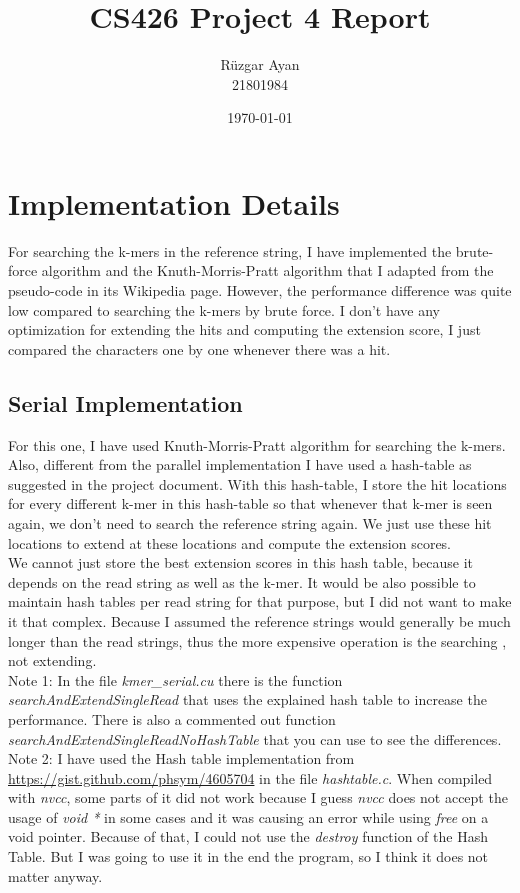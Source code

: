 \documentclass{article}
\title{CS426 Project 4 Report}
\author{Rüzgar Ayan \\ 21801984}
\date{\today}
\begin{document}
\maketitle

\section{Implementation Details}
For searching the k-mers in the reference string, I have implemented the brute-force algorithm and the Knuth-Morris-Pratt algorithm that I adapted from the pseudo-code in its Wikipedia page. However, the performance difference was quite low compared to searching the k-mers by brute force. I don't have any optimization for extending the hits and computing the extension score, I just compared the characters one by one whenever there was a hit.

\subsection{Serial Implementation}
For this one, I have used Knuth-Morris-Pratt algorithm for searching the k-mers. Also, different from the parallel implementation I have used a hash-table as suggested in the project document. With this hash-table, I store the hit locations for every different k-mer in this hash-table so that whenever that k-mer is seen again, we don't need to search the reference string again. We just use these hit locations to extend at these locations and compute the extension scores. \\

We cannot just store the best extension scores in this hash table, because it depends on the read string as well as the k-mer. It would be also possible to maintain hash tables per read string for that purpose, but I did not want to make it that complex. Because I assumed the reference strings would generally be much longer than the read strings, thus the more expensive operation is the searching , not extending.\\

Note 1: In the file \emph{kmer\_serial.cu} there is the function \emph{searchAndExtendSingleRead} that uses the explained hash table to increase the performance. There is also a commented out function \emph{searchAndExtendSingleReadNoHashTable} that you can use to see the differences. \\

Note 2: I have used the Hash table implementation from \href{https://gist.github.com/phsym/4605704}{https://gist.github.com/phsym/4605704} in the file \emph{hashtable.c}. When compiled with \emph{nvcc}, some parts of it did not work because I guess \emph{nvcc} does not accept the usage of \emph{void *} in some cases and it was causing an error while using \emph{free} on a void pointer. Because of that, I could not use the \emph{destroy} function of the Hash Table. But I was going to use it in the end the program, so I think it does not matter anyway.
\end{document}
